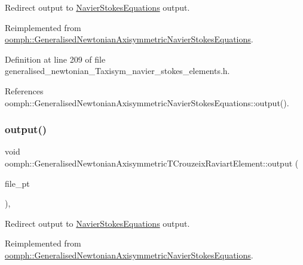 Redirect output to \hyperlink{classoomph_1_1NavierStokesEquations}{Navier\+Stokes\+Equations} output. 



Reimplemented from \hyperlink{classoomph_1_1GeneralisedNewtonianAxisymmetricNavierStokesEquations_a7c80af0c22f64c3484cdeac1edcbe28c}{oomph\+::\+Generalised\+Newtonian\+Axisymmetric\+Navier\+Stokes\+Equations}.



Definition at line 209 of file generalised\+\_\+newtonian\+\_\+\+Taxisym\+\_\+navier\+\_\+stokes\+\_\+elements.\+h.



References oomph\+::\+Generalised\+Newtonian\+Axisymmetric\+Navier\+Stokes\+Equations\+::output().

\mbox{\label{classoomph_1_1GeneralisedNewtonianAxisymmetricTCrouzeixRaviartElement_a8f3ca9d5dfb8d259e26fca5bef65fab2}} 
\subsubsection{\texorpdfstring{output()}{output()}\hspace{0.1cm}{\footnotesize\ttfamily [3/4]}}
{\footnotesize\ttfamily void oomph\+::\+Generalised\+Newtonian\+Axisymmetric\+T\+Crouzeix\+Raviart\+Element\+::output (\begin{DoxyParamCaption}\item[{F\+I\+LE $\ast$}]{file\+\_\+pt }\end{DoxyParamCaption})\hspace{0.3cm}{\ttfamily [inline]}, {\ttfamily [virtual]}}



Redirect output to \hyperlink{classoomph_1_1NavierStokesEquations}{Navier\+Stokes\+Equations} output. 



Reimplemented from \hyperlink{classoomph_1_1GeneralisedNewtonianAxisymmetricNavierStokesEquations_a34a51e3ad73df1ddca173e59a1404c90}{oomph\+::\+Generalised\+Newtonian\+Axisymmetric\+Navier\+Stokes\+Equations}.



